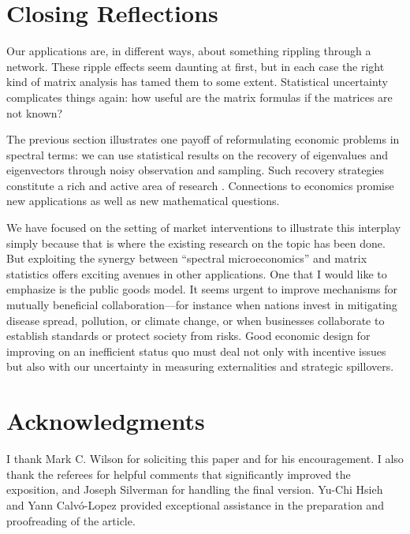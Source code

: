 \documentclass{notices}
\theoremstyle{definition}\newtheorem{problem}{Problem}
\theoremstyle{definition} \newtheorem{remark}{Remark}
\theoremstyle{definition} \newtheorem{claim}{Claim}
\theoremstyle{definition} \newtheorem{thm}{Theorem}
\theoremstyle{definition} \newtheorem*{thmNoNum}{Theorem}
\theoremstyle{definition} \newtheorem{definition}{Definition}
\theoremstyle{definition} \theoremstyle{remark}
\theoremstyle{definition} \newtheorem{note}{Note}
\theoremstyle{definition} \newtheorem{notation}{Notation}
\theoremstyle{definition} \theoremstyle{plain}
\theoremstyle{definition} \newtheorem{condition}{Condition}
\theoremstyle{definition} \newtheorem{lem}{Lemma}
\theoremstyle{definition} \newtheorem{corollary}{Corollary}
\theoremstyle{definition} \newtheorem{prop}{Proposition}
\theoremstyle{definition} \newtheorem{ax}{Axiom}
\theoremstyle{definition} \newtheorem{assumption}{Assumption}
\theoremstyle{definition} \newtheorem{example}{Example}
\theoremstyle{definition} \newtheorem{rmk}{Remark}
\theoremstyle{definition} \newtheorem{res}{Result}
\theoremstyle{definition} \newtheorem{que}{Question}
\theoremstyle{definition} \newtheorem{conjecture}{Conjecture}
\theoremstyle{definition}
\begin{document}
\section*{Closing Reflections} 

Our applications are, in different ways, about something rippling through a network. These ripple effects seem daunting at first, but in each case the right kind of matrix analysis has tamed them to some extent. Statistical uncertainty complicates things again: how useful are the matrix formulas if the matrices are not known?

The previous section illustrates one payoff of reformulating economic problems in spectral terms: we can use statistical results on the recovery of eigenvalues and eigenvectors through noisy observation and sampling. Such recovery strategies constitute a rich and active area of research \cite{chen2021spectral}. Connections to economics promise new applications as well as new mathematical questions.

We have focused on the setting of market interventions to illustrate this interplay simply because that is where the existing research on the topic has been done. But exploiting the synergy between ``spectral microeconomics'' and matrix statistics offers exciting avenues in other applications. One that I would like to emphasize is the public goods model. It seems urgent to improve mechanisms for mutually beneficial collaboration---for instance when nations invest in mitigating disease spread, pollution, or climate change, or when businesses collaborate to establish standards or protect society from risks. Good economic design for improving on an inefficient status quo must deal not only with incentive issues but also with our uncertainty in measuring externalities and strategic spillovers. 

 





\section*{Acknowledgments}
I thank Mark C. Wilson for soliciting this paper and for his encouragement. I also thank the referees for helpful comments that significantly improved the exposition, and Joseph Silverman for handling the final version. Yu-Chi Hsieh and Yann Calvó-Lopez provided exceptional assistance in the preparation and proofreading of the article.
\end{document}

